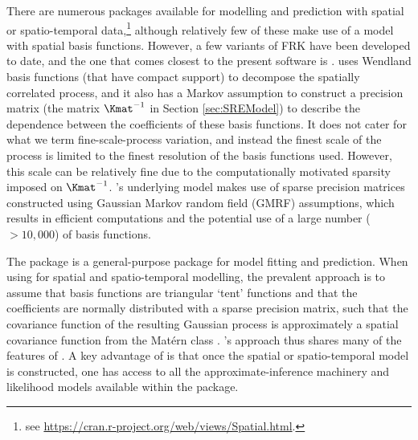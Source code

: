 There are numerous  packages available for modelling and prediction with spatial or spatio-temporal data,\footnote{see \url{https://cran.r-project.org/web/views/Spatial.html}.} although relatively few of these make use of a model with spatial basis functions. However, a few variants of FRK have been developed to date, and the one that comes closest to the present software is  \citep{Nychka_2015}.  uses Wendland basis functions (that have compact support) to decompose the spatially correlated process, and it also has a Markov assumption to construct a precision matrix  (the matrix $\Kmat^{-1}$ in Section \ref{sec:SREModel}) to describe the dependence between the coefficients of these basis functions. It does not cater for what we term fine-scale-process variation, and instead the finest scale of the process is limited to the finest resolution of the basis functions used. However, this scale can be relatively fine due to the computationally motivated sparsity imposed on $\Kmat^{-1}$.  's underlying model makes use of sparse precision matrices constructed using Gaussian Markov random field (GMRF) assumptions, which results in efficient computations and the potential use of a large number ($>10,000$) of basis functions. %

The package  is a general-purpose package for model fitting and prediction. When using  for spatial and spatio-temporal modelling, the prevalent approach is to assume that basis functions are triangular `tent' functions and that the coefficients are normally distributed with a sparse precision matrix, such that the covariance function of the resulting Gaussian process is approximately a spatial covariance function from the Mat{\'e}rn class \citep[see][for details on software implementation]{Lindgren_2015}. 's approach thus shares many of the features of . %
A key advantage of  is that once the spatial or spatio-temporal model is constructed, one has access to all the approximate-inference machinery and likelihood models available within the package.

